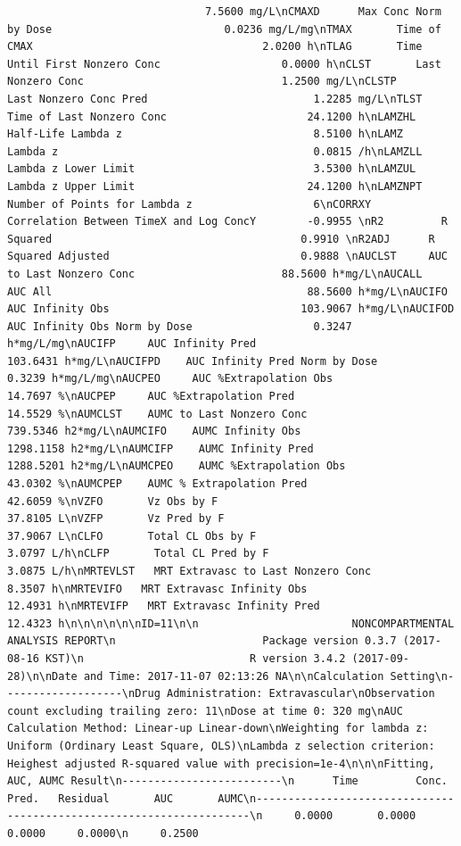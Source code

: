 \documentclass[12pt,]{krantz}
\theoremstyle{definition}
\theoremstyle{definition}
\theoremstyle{definition}
\theoremstyle{remark}
\begin{document}
\begin{verbatim}
                               7.5600 mg/L\nCMAXD      Max Conc Norm by Dose                           0.0236 mg/L/mg\nTMAX       Time of CMAX                                    2.0200 h\nTLAG       Time Until First Nonzero Conc                   0.0000 h\nCLST       Last Nonzero Conc                               1.2500 mg/L\nCLSTP      Last Nonzero Conc Pred                          1.2285 mg/L\nTLST       Time of Last Nonzero Conc                      24.1200 h\nLAMZHL     Half-Life Lambda z                              8.5100 h\nLAMZ       Lambda z                                        0.0815 /h\nLAMZLL     Lambda z Lower Limit                            3.5300 h\nLAMZUL     Lambda z Upper Limit                           24.1200 h\nLAMZNPT    Number of Points for Lambda z                   6\nCORRXY     Correlation Between TimeX and Log ConcY        -0.9955 \nR2         R Squared                                       0.9910 \nR2ADJ      R Squared Adjusted                              0.9888 \nAUCLST     AUC to Last Nonzero Conc                       88.5600 h*mg/L\nAUCALL     AUC All                                        88.5600 h*mg/L\nAUCIFO     AUC Infinity Obs                              103.9067 h*mg/L\nAUCIFOD    AUC Infinity Obs Norm by Dose                   0.3247 h*mg/L/mg\nAUCIFP     AUC Infinity Pred                             103.6431 h*mg/L\nAUCIFPD    AUC Infinity Pred Norm by Dose                  0.3239 h*mg/L/mg\nAUCPEO     AUC %Extrapolation Obs                         14.7697 %\nAUCPEP     AUC %Extrapolation Pred                        14.5529 %\nAUMCLST    AUMC to Last Nonzero Conc                     739.5346 h2*mg/L\nAUMCIFO    AUMC Infinity Obs                            1298.1158 h2*mg/L\nAUMCIFP    AUMC Infinity Pred                           1288.5201 h2*mg/L\nAUMCPEO    AUMC %Extrapolation Obs                        43.0302 %\nAUMCPEP    AUMC % Extrapolation Pred                      42.6059 %\nVZFO       Vz Obs by F                                    37.8105 L\nVZFP       Vz Pred by F                                   37.9067 L\nCLFO       Total CL Obs by F                               3.0797 L/h\nCLFP       Total CL Pred by F                              3.0875 L/h\nMRTEVLST   MRT Extravasc to Last Nonzero Conc              8.3507 h\nMRTEVIFO   MRT Extravasc Infinity Obs                     12.4931 h\nMRTEVIFP   MRT Extravasc Infinity Pred                    12.4323 h\n\n\n\n\n\nID=11\n\n                        NONCOMPARTMENTAL ANALYSIS REPORT\n                       Package version 0.3.7 (2017-08-16 KST)\n                          R version 3.4.2 (2017-09-28)\n\nDate and Time: 2017-11-07 02:13:26 NA\n\nCalculation Setting\n-------------------\nDrug Administration: Extravascular\nObservation count excluding trailing zero: 11\nDose at time 0: 320 mg\nAUC Calculation Method: Linear-up Linear-down\nWeighting for lambda z: Uniform (Ordinary Least Square, OLS)\nLambda z selection criterion: Heighest adjusted R-squared value with precision=1e-4\n\n\nFitting, AUC, AUMC Result\n-------------------------\n      Time         Conc.      Pred.   Residual       AUC       AUMC\n---------------------------------------------------------------------\n     0.0000       0.0000                           0.0000     0.0000\n     0.2500       
\end{verbatim}
\end{document}
